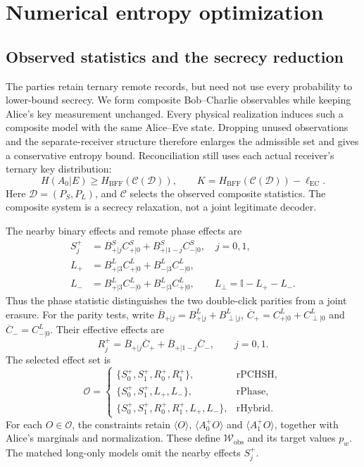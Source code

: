 \documentclass[aps,10pt,onecolumn,prx,superscriptaddress,longbibliography,nofootinbib]{revtex4-2}
\newcommand{\id}{\mathbb I}
\newcommand{\EC}{\ell_{\mathrm{EC}}}
\newcommand{\perpout}{\perp}
\newcommand{\rPCHSH}{\mathrm{rPCHSH}}
\newcommand{\rPhase}{\mathrm{rPhase}}
\newcommand{\rHybrid}{\mathrm{rHybrid}}
\begin{document}
\section{Numerical entropy optimization}\label{app:bff}

\subsection{Observed statistics and the secrecy reduction}\label{app:composite-reduction}

The parties retain ternary remote records, but need not use every probability to lower-bound secrecy. We form composite Bob--Charlie observables while keeping Alice's key measurement unchanged. Every physical realization induces such a composite model with the same Alice--Eve state. Dropping unused observations and the separate-receiver structure therefore enlarges the admissible set and gives a conservative entropy bound. Reconciliation still uses each actual receiver's ternary key distribution:
\begin{equation}
 H(A_0|E)\geq H_{\mathrm{BFF}}(\mathcal C(\mathcal D)),\qquad
 K=H_{\mathrm{BFF}}(\mathcal C(\mathcal D))-\EC.
 \label{eq:si-composite-safety}
\end{equation}
Here \(\mathcal D=(P_S,P_L)\), and \(\mathcal C\) selects the observed composite statistics. The composite system is a secrecy relaxation, not a joint legitimate decoder.

The nearby binary effects and remote phase effects are
\begin{align}
 S_j^+&=B^S_{+|j}C^S_{+|0}+B^S_{+|1-j}C^S_{-|0},\quad j=0,1,\nonumber\\
 L_+&=B^L_{+|3}C^L_{+|0}+B^L_{-|3}C^L_{-|0},\nonumber\\
 L_-&=B^L_{+|3}C^L_{-|0}+B^L_{-|3}C^L_{+|0},\qquad
 L_\perp=\id-L_+-L_-.
\end{align}
Thus the phase statistic distinguishes the two double-click parities from a joint erasure. For the parity tests, write
\(\overline B_{+|j}=B^L_{+|j}+B^L_{\perpout|j}\),
\(\overline C_+=C^L_{+|0}+C^L_{\perpout|0}\) and
\(\overline C_-=C^L_{-|0}\). Their effective effects are
\begin{equation}
 R_j^+=\overline B_{+|j}\overline C_+
       +\overline B_{+|1-j}\overline C_-,
 \qquad j=0,1.
\end{equation}
The selected effect set is
\begin{equation}
 \mathcal O=
 \begin{cases}
 \{S_0^+,S_1^+,R_0^+,R_1^+\},&\rPCHSH,\\
 \{S_0^+,S_1^+,L_+,L_-\},&\rPhase,\\
 \{S_0^+,S_1^+,R_0^+,R_1^+,L_+,L_-\},&\rHybrid.
 \end{cases}
\end{equation}
For each \(O\in\mathcal O\), the constraints retain
\(\langle O\rangle\), \(\langle A_0^+O\rangle\) and
\(\langle A_1^+O\rangle\), together with Alice's marginals and normalization.
These define \(\mathcal W_{\mathrm{obs}}\) and its target values \(p_w\).
The matched long-only models omit the nearby effects \(S_j^+\).
\end{document}
